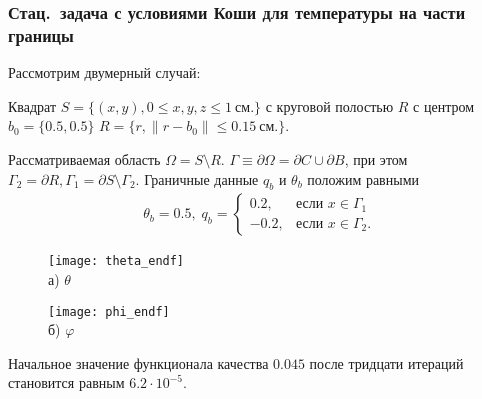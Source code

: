 
\begin{frame}
    \frametitle{Стац.\ задача с условиями Коши для температуры на части границы}
    Рассмотрим двумерный случай:

    Квадрат $S = \{(x, y), 0 \leq x,y,z \leq 1~\text{см.}\}$ с
    круговой полостью $R$ с центром $b_0 =\{0.5, 0.5\}$
    $R = \{r, \| r - b_0 \| \leq 0.15~\text{см.} \}$.

    Рассматриваемая область $\Omega = S \setminus R$.
    $\Gamma \equiv \partial \Omega = \partial C \cup \partial B$, при этом
    $ \Gamma_2 = \partial R, \Gamma_1 = \partial S \setminus \Gamma_2$.
    Граничные данные $q_b$ и $\theta_b$ положим равными
    \begin{gather*}
        \theta_b = 0.5, \;
        q_b =
        \begin{cases}
            0.2, & \text{если } x \in \Gamma_1 \\
            -0.2, & \text{если } x \in \Gamma_2.
        \end{cases}
    \end{gather*}
    \begin{figure}[h!t]
        \begin{minipage}[b][][b]{0.49\linewidth}
            \centering
            \texttt{[image: theta\_endf]}
            \\ а) $\theta$
        \end{minipage}
        \hfill
        \begin{minipage}[b][][b]{0.49\linewidth}
            \centering
            \texttt{[image: phi\_endf]}
            \\ б) $\varphi$
        \end{minipage}
        \label{fig:4_4:6}
    \end{figure}
    Начальное значение функционала качества $0.045$
    после тридцати итераций становится равным $6.2\cdot10^{-5}$.
\end{frame}
